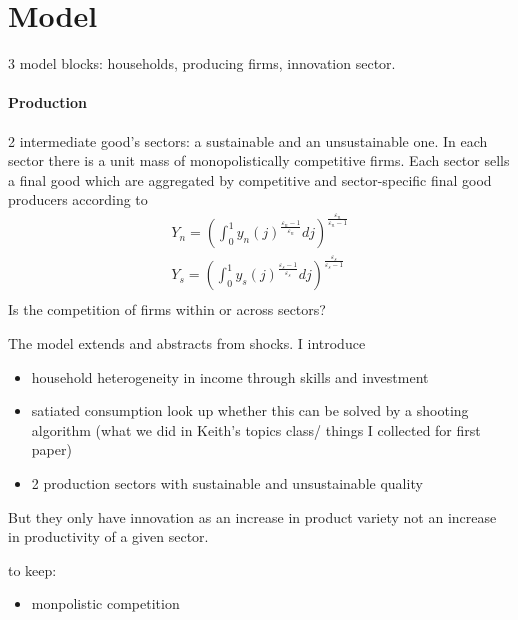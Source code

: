 \section{Model}

3 model blocks: households, producing firms, innovation sector.

\paragraph{Production}
2 intermediate good's sectors: a sustainable and an unsustainable one. In each sector there is a unit mass of monopolistically competitive firms. 
Each sector sells a final good which are aggregated by competitive and sector-specific final good producers according to
\begin{align}
	Y_n= \left(\int_{0}^{1} y_n(j)^{\frac{\varepsilon_n-1}{\varepsilon_n}}dj\right)^{\frac{\varepsilon_n}{\varepsilon_n-1}} \\
	Y_s= \left(\int_{0}^{1} y_s(j)^{\frac{\varepsilon_s-1}{\varepsilon_s}}dj\right)^{\frac{\varepsilon_s}{\varepsilon_s-1}} \\
\end{align}
Is the competition of firms within or across sectors?


The model extends \cite{Bilbiie2012EndogenousCycles} and abstracts from shocks. 
I introduce
\begin{itemize}
\item household heterogeneity in income through skills and investment
\item satiated consumption \ar look up whether this can be solved by a shooting algorithm (what we did in Keith's topics class/ things I collected for first paper)
\item 2 production sectors with sustainable and unsustainable quality
\end{itemize}

But they only have innovation as an increase in product variety not an increase in productivity of a given sector.

to keep:
\begin{itemize}
\item monpolistic competition
\end{itemize}

